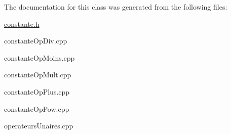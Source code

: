 The documentation for this class was generated from the following files\-:\begin{DoxyCompactItemize}
\item 
\hyperlink{constante_8h}{constante.\-h}\item 
constante\-Op\-Div.\-cpp\item 
constante\-Op\-Moins.\-cpp\item 
constante\-Op\-Mult.\-cpp\item 
constante\-Op\-Plus.\-cpp\item 
constante\-Op\-Pow.\-cpp\item 
operateurs\-Unaires.\-cpp\end{DoxyCompactItemize}
